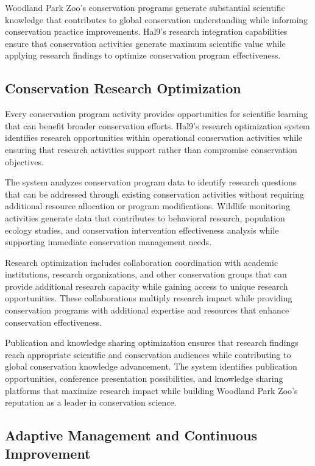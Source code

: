 \documentclass[
  Letterpaper,
]{scrbook}
\begin{document}
Woodland Park Zoo's conservation programs generate substantial
scientific knowledge that contributes to global conservation
understanding while informing conservation practice improvements. Hal9's
research integration capabilities ensure that conservation activities
generate maximum scientific value while applying research findings to
optimize conservation program effectiveness.

\subsection{Conservation Research
Optimization}\label{conservation-research-optimization}

Every conservation program activity provides opportunities for
scientific learning that can benefit broader conservation efforts.
Hal9's research optimization system identifies research opportunities
within operational conservation activities while ensuring that research
activities support rather than compromise conservation objectives.

The system analyzes conservation program data to identify research
questions that can be addressed through existing conservation activities
without requiring additional resource allocation or program
modifications. Wildlife monitoring activities generate data that
contributes to behavioral research, population ecology studies, and
conservation intervention effectiveness analysis while supporting
immediate conservation management needs.

Research optimization includes collaboration coordination with academic
institutions, research organizations, and other conservation groups that
can provide additional research capacity while gaining access to unique
research opportunities. These collaborations multiply research impact
while providing conservation programs with additional expertise and
resources that enhance conservation effectiveness.

Publication and knowledge sharing optimization ensures that research
findings reach appropriate scientific and conservation audiences while
contributing to global conservation knowledge advancement. The system
identifies publication opportunities, conference presentation
possibilities, and knowledge sharing platforms that maximize research
impact while building Woodland Park Zoo's reputation as a leader in
conservation science.

\subsection{Adaptive Management and Continuous
Improvement}\label{adaptive-management-and-continuous-improvement}
\end{document}
